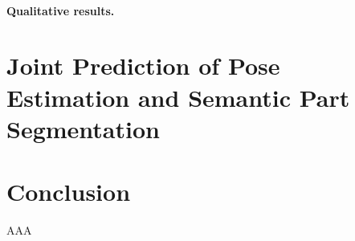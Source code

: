 \begin{table}[!tb]
  \centering
  \setlength{\tabcolsep}{10pt}
  \caption{Instance-wise part segmentation accuracy on PASCAL-Person-Part in terms of $AP^r_{part}$.}
\label{table:apr_part_eccv}
\end{table}  

\paragraph{\textbf{Qualitative results.}} 


\section{Joint Prediction of Pose Estimation and Semantic Part Segmentation}
\label{sec:pose_and_seg}

\section{Conclusion}

\begin{acknowledgements}
AAA
\end{acknowledgements}


